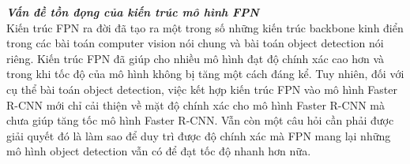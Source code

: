 {    \noindent
    \textbf{\textit{Vấn đề tồn đọng của kiến trúc mô hình FPN}} \\
    Kiến trúc FPN ra đời đã tạo ra một trong số những kiến trúc backbone kinh điển trong các bài toán computer vision nói chung và bài toán object detection nói riêng.
    Kiến trúc FPN đã giúp cho nhiều mô hình đạt độ chính xác cao hơn và trong khi tốc độ của mô hình không bị tăng một cách đáng kể.
    Tuy nhiên, đối với cụ thể bài toán object detection, việc kết hợp kiến trúc FPN vào mô hình Faster R-CNN mới chỉ cải thiện về mặt độ chính xác cho mô hình Faster R-CNN mà chưa giúp tăng tốc mô hình Faster R-CNN.
    Vẫn còn một câu hỏi cần phải được giải quyết đó là làm sao để duy trì được độ chính xác mà FPN mang lại những mô hình object detection vẫn có để đạt tốc độ nhanh hơn nữa.
}